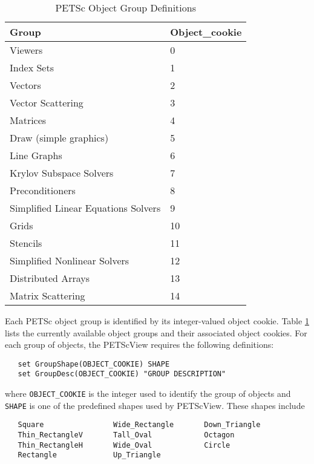 {\begin{table}
\begin{center}
\begin{tabular}{||l||l||} \hline
{\bf Group}                              & {\bf Object\_cookie} \\
\hline
Viewers                            &  0 \\
Index Sets                         &  1 \\
Vectors                            &  2 \\
Vector Scattering                  &  3 \\
Matrices                           &  4 \\
Draw (simple graphics)             &  5 \\
Line Graphs                        &  6 \\
Krylov Subspace Solvers            &  7 \\
Preconditioners                    &  8 \\
Simplified Linear Equations Solvers     &  9 \\
Grids                              & 10 \\
Stencils                           & 11 \\
Simplified Nonlinear Solvers       & 12 \\
Distributed Arrays                 & 13 \\
Matrix Scattering                  & 14 \\
\hline
\end{tabular}
\end{center}
\caption{PETSc Object Group Definitions}
\label{PETSc_object_definitions}
\end{table}

Each PETSc object group is identified by its integer-valued object
cookie.  Table \ref{PETSc_object_definitions} lists the
currently available object groups and their associated object cookies.
For each group of objects, the PETScView requires the following
definitions:
\begin{verbatim}
   set GroupShape(OBJECT_COOKIE) SHAPE 
   set GroupDesc(OBJECT_COOKIE) "GROUP DESCRIPTION"
\end{verbatim}
where {\tt OBJECT\_COOKIE} is the integer used to identify the group
of objects and {\tt SHAPE} is one of the predefined shapes used by
PETScView.  These shapes include
\begin{verbatim}
   Square                Wide_Rectangle       Down_Triangle
   Thin_RectangleV       Tall_Oval            Octagon
   Thin_RectangleH       Wide_Oval            Circle
   Rectangle             Up_Triangle
\end{verbatim}

}
